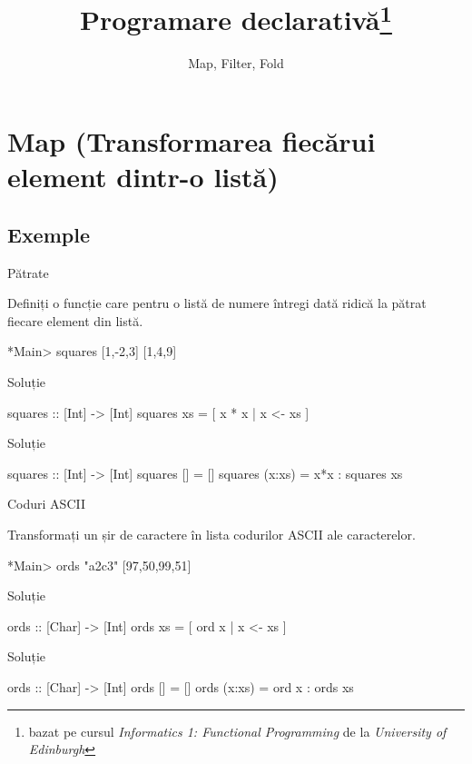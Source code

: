 \documentclass[xcolor=pdftex,romanian,colorlinks]{beamer}
\title[PD---Funcții de ordin înalt]{Programare declarativă\thanks{bazat pe cursul \emph{Informatics 1: Functional Programming} de la \emph{University of Edinburgh}}}
\subtitle{Map, Filter, Fold}
\begin{document}
\begin{frame}
  \titlepage
\end{frame}

\section{Map (Transformarea fiecărui element dintr-o listă)}

\subsection{Exemple}

\begin{frame}[fragile]{Pătrate}
\begin{block}{}
Definiți o funcție care pentru o listă de numere întregi dată  ridică la pătrat fiecare element din listă.
\begin{asciihs}
*Main> squares [1,-2,3]
[1,4,9]
\end{asciihs}
\end{block}
\begin{block}{Soluție }
\begin{asciihs}
squares :: [Int] -> [Int]
squares xs = [ x * x | x <- xs ]
\end{asciihs}
\end{block}
\begin{block}{Soluție }
\begin{asciihs}
squares :: [Int] -> [Int]
squares []     = []
squares (x:xs) = x*x : squares xs
\end{asciihs}
\end{block}
\end{frame}

\begin{frame}[fragile]
{Coduri ASCII}
\begin{block}{}
Transformați un șir de caractere în lista codurilor ASCII ale caracterelor.
\begin{asciihs}
*Main> ords "a2c3"
[97,50,99,51]
\end{asciihs}
\end{block}
\begin{block}{Soluție }
\begin{asciihs}
ords :: [Char] -> [Int]
ords xs = [ ord x | x <- xs ]
\end{asciihs}
\end{block}
\begin{block}{Soluție }
\begin{asciihs}
ords :: [Char] -> [Int]
ords []     = []
ords (x:xs) = ord x : ords xs
\end{asciihs}
\end{block}
\end{frame}
\end{document}
